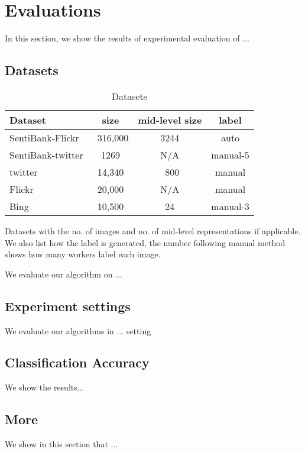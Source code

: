 \section{Evaluations}
\label{evaluation}

In this section, we show the results of experimental evaluation of ...

\subsection{Datasets}
\label{eval_datasets}

\begin{table}
		\vspace{-0.5cm}
		\caption{Datasets}
		\label{table:datasets}
		\begin{threeparttable}
			\centering
			\begin{tabular}{l|ccc} \hline
				Dataset & size & mid-level size & label \\ \hline
				SentiBank-Flickr \cite{borth2013large, chen2014deepsentibank, jou2015visual} & ~316,000 & 3244 & auto \\ 
				SentiBank-twitter \cite{borth2013large, chen2014deepsentibank, jou2015visual} & 1269 & N/A & manual-5 \\
				twitter \cite{yuan2013sentribute} & 14,340 & ~800 & manual \\
				Flickr \cite{wang2015unsupervised} & 20,000 & N/A & manual \\
				Bing \cite{ahsan2017towards} & 10,500 & 24 & manual-3 \\ \hline
			\end{tabular}
			\begin{tablenotes}
				\item Datasets with the no. of images and no. of mid-level representations if applicable. We also list how the label is generated, the number following manual method shows how many workers label each image.
			\end{tablenotes}
		\end{threeparttable}
		\vspace{-0.3cm}
\end{table}

We evaluate our algorithm on ...

\subsection{Experiment settings}
\label{eval_system}

We evaluate our algorithms in ... setting

\subsection{Classification Accuracy}
\label{eval_accuracy}

We show the results...

\subsection{More}
\label{eval_more}


We show in this section that ...
